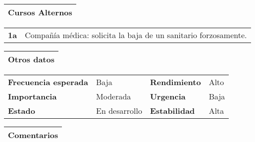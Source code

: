 \documentclass[11pt,a4paper]{article}
\begin{document}
\begin{table}[H]
	\begin{tabularx}{\textwidth}{X}
		\textbf{Cursos Alternos}\\ \hline
	\end{tabularx}
	
		\begin{tabularx}{\textwidth}{cX}
		\textbf{1a} & Compañía médica: solicita la baja de un sanitario forzosamente.
	\end{tabularx}
\end{table}

\begin{table}[H]
	\begin{tabularx}{\textwidth}{X}
		\textbf{Otros datos}\\ \hline
	\end{tabularx}

	\begin{tabularx}{\textwidth}{lXlX}
		\textbf{Frecuencia esperada} & Baja & \textbf{Rendimiento} & Alto\\
		\textbf{Importancia} & Moderada & \textbf{Urgencia} & Baja\\
		\textbf{Estado} & En desarrollo & \textbf{Estabilidad} & Alta\\
	\end{tabularx}
	
	\begin{tabularx}{\textwidth}{X}
		\textbf{Comentarios}\\ \hline
	\end{tabularx}
\end{table}

\newpage


\end{document}
